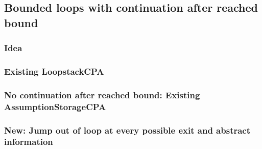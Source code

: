 \subsection{Bounded loops with continuation after reached bound}
\subsubsection{Idea}
\subsubsection{Existing LoopstackCPA}
\subsubsection{No continuation after reached bound: Existing AssumptionStorageCPA}
\subsubsection{New: Jump out of loop at every possible exit and abstract information}

